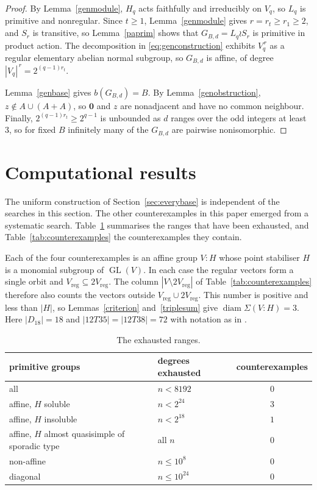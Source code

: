 \documentclass[a4paper,reqno,11pt]{amsart}
\newcommand\GL{\operatorname{GL}}
\newcommand\diam{\operatorname{diam}}
\numberwithin{equation}{section}
\begin{document}
\begin{proof}
By Lemma~\ref{genmodule}, $H_q$ acts faithfully and irreducibly on $V_q$, so $L_q$ is primitive and nonregular. Since $t\ge1$, Lemma~\ref{genmodule} gives $r=r_t\ge r_1\ge2$, and $S_r$ is transitive, so Lemma~\ref{paprim} shows that $G_{B,d}=L_q\wr S_r$ is primitive in product action. The decomposition in \eqref{eq:genconstruction} exhibits $V_q^{\,r}$ as a regular elementary abelian normal subgroup, so $G_{B,d}$ is affine, of degree $|V_q|^{\,r}=2^{(q-1)r_t}$.

Lemma~\ref{genbase} gives $b(G_{B,d})=B$. By Lemma~\ref{genobstruction}, $z\notin A\cup(A+A)$, so $\mathbf0$ and $z$ are nonadjacent and have no common neighbour. Finally, $2^{(q-1)r_t}\ge2^{q-1}$ is unbounded as $d$ ranges over the odd integers at least $3$, so for fixed $B$ infinitely many of the $G_{B,d}$ are pairwise nonisomorphic.
\end{proof}


\section{Computational results}\label{sec:searches}

The uniform construction of Section~\ref{sec:everybase} is independent of the searches in this section. The other counterexamples in this paper emerged from a systematic search. Table~\ref{tab:ranges} summarises the ranges that have been exhausted, and Table~\ref{tab:counterexamples} the counterexamples they contain.

Each of the four counterexamples is an affine group $V{:}H$ whose point stabiliser $H$ is a monomial subgroup of $\GL(V)$. In each case the regular vectors form a single orbit and $V_{\mathrm{reg}}\subseteq2V_{\mathrm{reg}}$. The column $|V\setminus2V_{\mathrm{reg}}|$ of Table~\ref{tab:counterexamples} therefore also counts the vectors outside $V_{\mathrm{reg}}\cup2V_{\mathrm{reg}}$. This number is positive and less than $|H|$, so Lemmas~\ref{criterion} and~\ref{triplesum} give $\diam\Sigma(V{:}H)=3$. Here $|D_{18}|=18$ and $|12T35|=|12T38|=72$ with notation as in \cite{GAP}.


\begin{table}[!htbp]
\centering
\begin{tabular}{llc}
\hline
primitive groups & degrees exhausted & counterexamples\\
\hline
all & $n<8192$ & $0$\\
affine, $H$ soluble & $n < 2^{24}$ & $3$\\
affine, $H$ insoluble & $n < 2^{18}$ & $1$\\
affine, $H$ almost quasisimple of sporadic type & all $n$ & $0$\\
non-affine & $n\le10^{8}$ & $0$\\
diagonal & $n\le10^{24}$ & $0$\\
\hline
\end{tabular}
\smallskip
\caption{The exhausted ranges.}
\label{tab:ranges}
\end{table}
\end{document}
